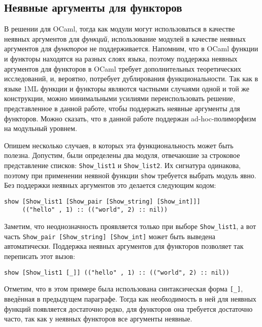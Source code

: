 \documentclass[../diploma.tex]{subfiles}
\begin{document}
\subsection{Неявные аргументы для функторов}

В решении для OCaml, тогда как модули могут использоваться в качестве неявных аргументов для \textit{функций}, использование модулей в качестве неявных аргументов для \textit{функторов} не поддерживается. Напомним, что в OCaml функции и функторы находятся на разных слоях языка, поэтому поддержка неявных аргументов для функторов в OCaml требует дополнительных теоретических исследований, и, вероятно, потребует дублирования функциональности. Так как в языке 1ML функции и функторы являются частными случаями одной и той же конструкции, можно минимальными усилиями переиспользовать решение, представленное в данной работе, чтобы поддержать неявные аргументы для функторов. Можно сказать, что в данной работе поддержан ad-hoc-полиморфизм на модульный уровнем. 

Опишем несколько случаев, в которых эта функциональность может быть полезна. Допустим, были определены два модуля, отвечаюшие за строковое представление списков: \texttt{Show_list1} и \texttt{Show_list2}. Их сигнатура одинакова, поэтому при применении неявной функции \texttt{show} требуется выбрать модуль явно. Без поддержки неявных аргументов это делается следующим кодом:

\begin{verbatim}
show [Show_list1 [Show_pair [Show_string] [Show_int]]]
     (("hello" , 1) :: (("world", 2) :: nil))
\end{verbatim}

Заметим, что неоднозначность проявляется только при выборе \texttt{Show_list1}, а вот часть \texttt{Show_pair [Show_string] [Show_int]} может быть выведена автоматически. Поддержка неявных аргументов для функторов позволяет так переписать этот вызов:

\begin{verbatim}
show [Show_list1 [_]] (("hello" , 1) :: (("world", 2) :: nil))
\end{verbatim}

Отметим, что в этом примере была использована синтаксическая форма \texttt{[_]}, введённая в предыдущем параграфе. Тогда как необходимость в ней для неявных функций появляется достаточно редко, для функторов она требуется достаточно часто, так как у неявных функторов все аргументы неявные.
\end{document}
